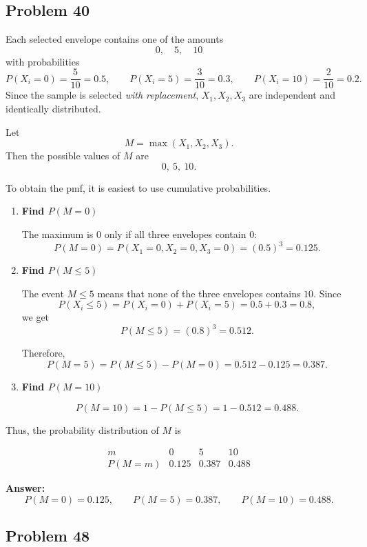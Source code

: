 \subsection*{Problem 40}

Each selected envelope contains one of the amounts
\[
0,\quad 5,\quad 10
\]
with probabilities
\[
P(X_i=0)=\frac{5}{10}=0.5,\qquad
P(X_i=5)=\frac{3}{10}=0.3,\qquad
P(X_i=10)=\frac{2}{10}=0.2.
\]
Since the sample is selected \emph{with replacement}, $X_1,X_2,X_3$ are independent and identically distributed.

Let
\[
M=\max(X_1,X_2,X_3).
\]
Then the possible values of $M$ are
\[
0,\ 5,\ 10.
\]

To obtain the pmf, it is easiest to use cumulative probabilities.

\begin{enumerate}
    \item[\textbf{1.}] \textbf{Find $P(M=0)$}

    The maximum is $0$ only if all three envelopes contain $0$:
    \[
    P(M=0)=P(X_1=0,X_2=0,X_3=0)=(0.5)^3=0.125.
    \]

    \item[\textbf{2.}] \textbf{Find $P(M\le 5)$}

    The event $M\le 5$ means that none of the three envelopes contains $10$.
    Since
    \[
    P(X_i\le 5)=P(X_i=0)+P(X_i=5)=0.5+0.3=0.8,
    \]
    we get
    \[
    P(M\le 5)=(0.8)^3=0.512.
    \]

    Therefore,
    \[
    P(M=5)=P(M\le 5)-P(M=0)=0.512-0.125=0.387.
    \]

    \item[\textbf{3.}] \textbf{Find $P(M=10)$}

    \[
    P(M=10)=1-P(M\le 5)=1-0.512=0.488.
    \]
\end{enumerate}

Thus, the probability distribution of $M$ is

\[
\begin{array}{c|ccc}
m & 0 & 5 & 10\\
\hline
P(M=m) & 0.125 & 0.387 & 0.488
\end{array}
\]

\textbf{Answer:}
\[
P(M=0)=0.125,\qquad P(M=5)=0.387,\qquad P(M=10)=0.488.
\]

\subsection*{Problem 48}

